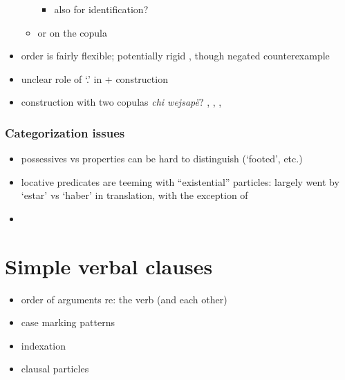 \documentclass{memoir}
\begin{document}
\begin{itemize}
\begin{itemize}
    \begin{itemize}
    \tightlist
    \item
      also for identification? 
    \end{itemize}
  \item
     or  on the copula
  \end{itemize}
\item
  order is fairly flexible; potentially rigid
  \textsubscript{} \textsubscript{}
  , though negated counterexample 
\item
  unclear role of  `.' in 
  +  construction
\item
  construction with two copulas \emph{chi wejsapë}?
  , ,
  , 
\end{itemize}

\subsection{Categorization issues}

\begin{itemize}
\item
  possessives vs properties can be hard to distinguish (`footed', etc.)
\item
  locative predicates are teeming with ``existential'' particles:
  largely went by `estar' vs `haber' in translation, with the exception
  of 
\item
\end{itemize}

\chapter{\texorpdfstring{Simple verbal clauses
\label{simpleverb}}{Simple verbal clauses }}

\begin{itemize}
\tightlist
\item
  order of arguments re: the verb (and each other)
\item
  case marking patterns
\item
  indexation
\item
  clausal particles
\end{itemize}
\end{document}
